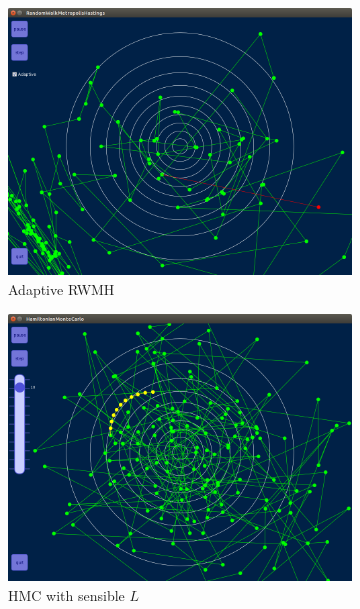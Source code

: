 \documentclass[10pt]{proc}
\begin{document}
\begin{figure}[htp]
\centering
\begin{subfigure}[t]{0.49\textwidth}
  \includegraphics[width=\textwidth]{processing_rwmh.png}
  \caption{Adaptive RWMH}
\end{subfigure}
\begin{subfigure}[t]{0.49\textwidth}
  \includegraphics[width=\textwidth]{processing_hmc.png}
  \caption{HMC with sensible $L$}
\end{subfigure}
\begin{subfigure}[t]{0.49\textwidth}

\end{subfigure}
\end{figure}
\end{document}
